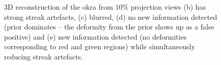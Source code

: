 \documentclass{article}
\begin{document}
\begin{figure}[!h]
\caption[3D reconstruction of okra dataset]{3D reconstruction of the okra from $10\%$ projection
  views (b) has strong streak artefacts, (c) blurred, (d) no new
  information detected (prior dominates -- the deformity from the prior
  shows up as a false positive) and (e) new information detected (no deformities
  corresponding to red and green regions) while simultaneously
  reducing streak artefacts.}
\label{fig:okra_3D_results}
\end{figure}

\end{document}
